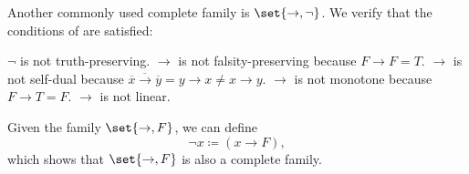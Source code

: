 \begin{example}
\begin{thmenum}
     Another commonly used complete family is \( \set{ \to, \neg } \).
    We verify that the conditions of  are satisfied:
    \begin{reflist}
       \( \neg \) is not truth-preserving.
       \( \to \) is not falsity-preserving because \( F \to F = T \).
       \( \to \) is not self-dual because \( \overline{\overline{x} \to \overline{y}} = y \to x \neq x \to y \).
       \( \to \) is not monotone because \( F \to T = F \).
       \( \to \) is not linear.
    \end{reflist}

     Given the family \( \set{ \to, F } \), we can define
    \begin{equation}
      \neg x \coloneqq (x \to F),
    \end{equation}
    which shows that \( \set{ \to, F } \) is also a complete family.
  \end{thmenum}
\end{example}
